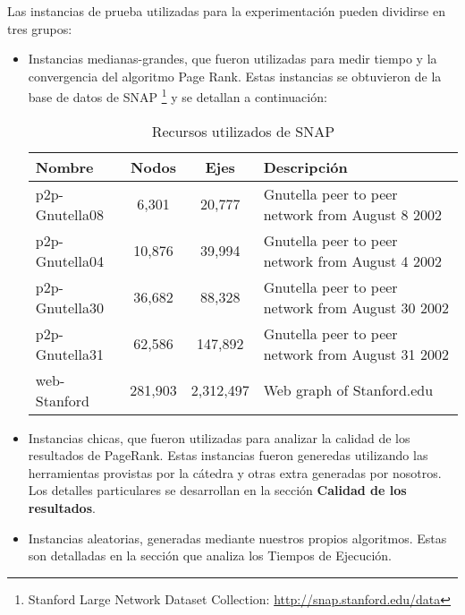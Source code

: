 Las instancias de prueba utilizadas para la experimentación pueden dividirse en tres grupos:
\begin{itemize}
    \item Instancias medianas-grandes, que fueron utilizadas para medir tiempo y la convergencia del algoritmo Page Rank.
        Estas instancias se obtuvieron de la base de datos de SNAP \footnote{Stanford Large Network Dataset Collection:
        \url{http://snap.stanford.edu/data}} y se detallan a continuación:

        \begin{table}[H]
            \begin{center}
                \begin{tabular}{| l | c | c | l |}
                    \hline
                    Nombre          &Nodos      &Ejes       & Descripción \\ \hline
                    p2p-Gnutella08 	&6,301  	&20,777 	& Gnutella peer to peer network from August 8 2002 \\
                    p2p-Gnutella04 	&10,876  	&39,994 	& Gnutella peer to peer network from August 4 2002 \\
                    p2p-Gnutella30 	&36,682  	&88,328 	& Gnutella peer to peer network from August 30 2002 \\
                    p2p-Gnutella31 	&62,586  	&147,892 	& Gnutella peer to peer network from August 31 2002 \\
                    web-Stanford 	&281,903  	&2,312,497 	& Web graph of Stanford.edu \\
                    \hline
                \end{tabular}
                \captionsetup{justification=centering}
                \caption{Recursos utilizados de SNAP}
                \label{recursos_snap}
            \end{center}
        \end{table}


    \item Instancias chicas, que fueron utilizadas para analizar la calidad de los resultados de PageRank.
        Estas instancias fueron generedas utilizando las herramientas provistas por la cátedra y otras extra generadas por nosotros.
        Los detalles particulares se desarrollan en la sección \textbf{Calidad de los resultados}.

    \item Instancias aleatorias, generadas mediante nuestros propios algoritmos. Estas son detalladas en la sección que analiza los Tiempos de Ejecución.
\end{itemize}

